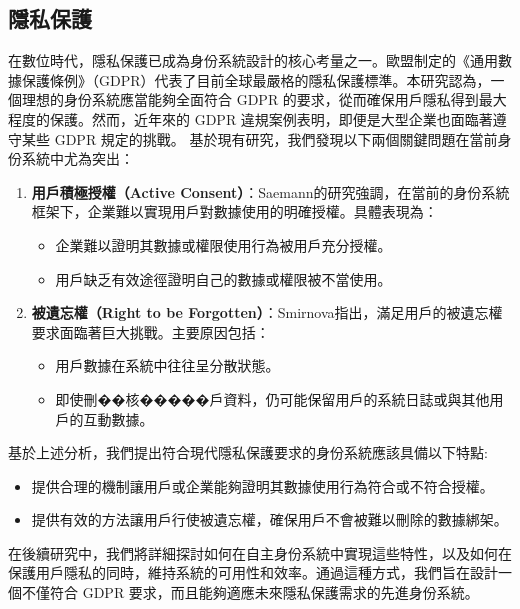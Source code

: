 \subsection{隱私保護}
在數位時代，隱私保護已成為身份系統設計的核心考量之一。歐盟制定的《通用數據保護條例》（GDPR）代表了目前全球最嚴格的隱私保護標準。本研究認為，一個理想的身份系統應當能夠全面符合 GDPR 的要求，從而確保用戶隱私得到最大程度的保護。然而，近年來的 GDPR 違規案例表明，即便是大型企業也面臨著遵守某些 GDPR 規定的挑戰。
基於現有研究，我們發現以下兩個關鍵問題在當前身份系統中尤為突出：
\begin{enumerate}
  \item \textbf{用戶積極授權（Active Consent）}：Saemann\cite{saemann2022investigating}的研究強調，在當前的身份系統框架下，企業難以實現用戶對數據使用的明確授權。具體表現為：
        \begin{itemize}
          \item 企業難以證明其數據或權限使用行為被用戶充分授權。
          \item 用戶缺乏有效途徑證明自己的數據或權限被不當使用。
        \end{itemize}
  \item \textbf{被遺忘權（Right to be Forgotten）}：Smirnova\cite{smirnova2024understanding}指出，滿足用戶的被遺忘權要求面臨著巨大挑戰。主要原因包括：
        \begin{itemize}
          \item 用戶數據在系統中往往呈分散狀態。
          \item 即使刪��核�����戶資料，仍可能保留用戶的系統日誌或與其他用戶的互動數據。
        \end{itemize}
\end{enumerate}
基於上述分析，我們提出符合現代隱私保護要求的身份系統應該具備以下特點:
\begin{itemize}
  \item 提供合理的機制讓用戶或企業能夠證明其數據使用行為符合或不符合授權。
  \item 提供有效的方法讓用戶行使被遺忘權，確保用戶不會被難以刪除的數據綁架。
\end{itemize}
在後續研究中，我們將詳細探討如何在自主身份系統中實現這些特性，以及如何在保護用戶隱私的同時，維持系統的可用性和效率。通過這種方式，我們旨在設計一個不僅符合 GDPR 要求，而且能夠適應未來隱私保護需求的先進身份系統。
